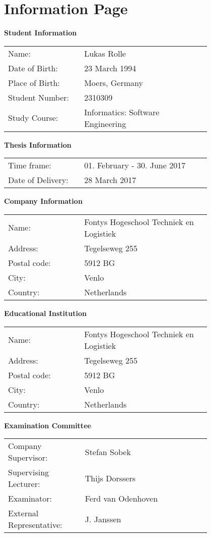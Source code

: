 \chapter*{Information Page}
\textbf{Student Information} \hfill \vspace{0.3cm} \\
\begin{tabular}{p{0.3\linewidth} p{0.5\linewidth}}
	Name: & Lukas Rolle \\
	Date of Birth: & 23 March 1994 \\
	Place of Birth: & Moers, Germany \\
	Student Number: & 2310309 \\
	Study Course: & Informatics: Software Engineering
\end{tabular}

\textbf{Thesis Information} \hfill \vspace{0.3cm} \\
\begin{tabular}{p{0.3\linewidth} p{0.5\linewidth}}
	Time frame: & 01. February - 30. June 2017 \\
	Date of Delivery: & 28 March 2017
\end{tabular}

\textbf{Company Information} \hfill \vspace{0.3cm} \\
\begin{tabular}{p{0.3\linewidth} p{0.5\linewidth}}
	Name: & Fontys Hogeschool Techniek en Logistiek\\
	Address: & Tegelseweg 255\\
	Postal code: & 5912 BG\\
	City: & Venlo \\
	Country: & Netherlands
\end{tabular}

\textbf{Educational Institution} \hfill \vspace{0.3cm} \\
\begin{tabular}{p{0.3\linewidth} p{0.5\linewidth}}
	Name: & Fontys Hogeschool Techniek en Logistiek \\
	Address: & Tegelseweg 255 \\
	Postal code: & 5912 BG \\
	City: & Venlo\\
	Country: & Netherlands 
\end{tabular}

\textbf{Examination Committee} \hfill \vspace{0.3cm} \\
\begin{tabular}{p{0.3\linewidth} p{0.5\linewidth}}
	Company Supervisor: & Stefan Sobek	\\
	Supervising Lecturer: & Thijs Dorssers \\
	Examinator: & Ferd van Odenhoven \\
	External Representative:  & J. Janssen
\end{tabular}
